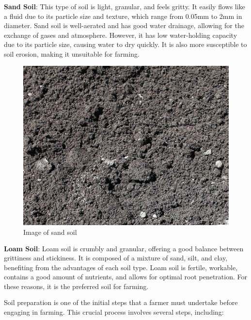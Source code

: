 \documentclass{article}
\begin{document}
\begin{flushleft}
\textbf{Sand Soil}: This type of soil is light, granular, and feels gritty. It easily flows like a fluid due to its particle size and texture, which range from 0.05mm to 2mm in diameter.
 Sand soil is well-aerated and has good water drainage, allowing for the exchange of gases and atmosphere. However, it has low water-holding capacity due to its particle size, causing water to dry quickly. It is also more susceptible to soil erosion, making it unsuitable for farming.
\newline
\begin{center}
    \begin{figure}[h]
        \centering
    \includegraphics[scale=0.5]{Soil/Sand-Soil.jpg}
    \caption{Image of sand soil}
    \end{figure}
    \end{center}


\vspace*{5pt}
\textbf{Loam Soil}: Loam soil is crumbly and granular, offering a good balance between grittiness and stickiness. It is composed of a mixture of sand, silt, and clay, 
benefiting from the advantages of each soil type. Loam soil is fertile, workable, contains a good amount of nutrients, and allows for optimal root penetration. For these reasons, it is the preferred soil for farming.

Soil preparation is one of the initial steps that a farmer must undertake before engaging in farming. This crucial process involves several steps, including:
\newline


\end{flushleft}
\end{document}
